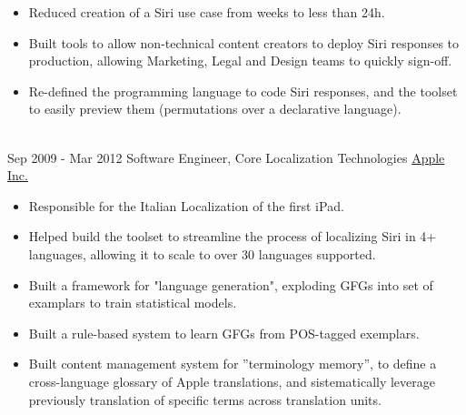 \documentclass[letterpaper]{twentysecondcv} %
\begin{document}
\begin{twenty}
{{\begin{itemize}
        \item Reduced creation of a Siri use case from weeks to less than 24h.
        \item Built tools to allow non-technical content creators to deploy Siri responses to production, allowing Marketing, Legal and Design teams to quickly sign-off.
        \item Re-defined the programming language to code Siri responses, and the toolset to easily preview them (permutations over a declarative language).
        \end{itemize}}
        }
    \\
  \twentyitem
      {Sep 2009 -}
    {Mar 2012}
        {Software Engineer, Core Localization Technologies}
        {\href{http://www.apple.com}{Apple Inc.}}
        {}
        {
        {\begin{itemize}
        \item Responsible for the Italian Localization of the first iPad.
        \item Helped build the toolset to streamline the process of localizing Siri in 4+ languages, allowing it to scale to over 30 languages supported.
        \item Built a framework for "language generation", exploding GFGs into set of examplars to train statistical models.
        \item Built a rule-based system to learn GFGs from POS-tagged exemplars.
        \item Built content management system for ”terminology memory”, to define a cross-language glossary of Apple translations, and sistematically leverage previously translation of specific terms across translation units.
        \end{itemize}}
        }
    \\ 

\end{twenty}
\end{document}
